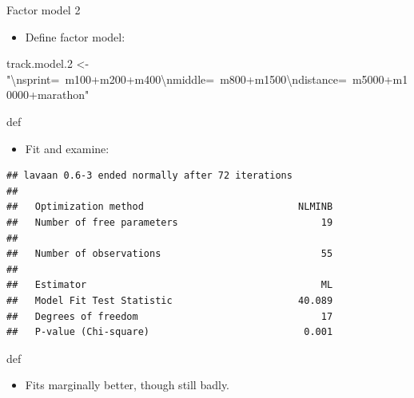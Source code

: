 \documentclass[ignorenonframetext,]{beamer}
\newenvironment{Shaded}{\begin{snugshade}}{\end{snugshade}}
\newcommand{\CharTok}[1]{\textcolor[rgb]{0.31,0.60,0.02}{#1}}
\newcommand{\DataTypeTok}[1]{\textcolor[rgb]{0.13,0.29,0.53}{#1}}
\newcommand{\FloatTok}[1]{\textcolor[rgb]{0.00,0.00,0.81}{#1}}
\newcommand{\KeywordTok}[1]{\textcolor[rgb]{0.13,0.29,0.53}{\textbf{#1}}}
\newcommand{\NormalTok}[1]{#1}
\newcommand{\OperatorTok}[1]{\textcolor[rgb]{0.81,0.36,0.00}{\textbf{#1}}}
\newcommand{\StringTok}[1]{\textcolor[rgb]{0.31,0.60,0.02}{#1}}
\providecommand{\tightlist}{%
  \setlength{\itemsep}{0pt}\setlength{\parskip}{0pt}}
\begin{document}
\begin{frame}[fragile]{Factor model 2}
\protect\hypertarget{factor-model-2}{}

\begin{itemize}
\tightlist
\item
  Define factor model:
\end{itemize}

\begin{Shaded}
\begin{Highlighting}[]
\NormalTok{track.model}\FloatTok{.2}\NormalTok{ <-}\StringTok{ "}\CharTok{\textbackslash{}n}\StringTok{sprint=~m100+m200+m400}\CharTok{\textbackslash{}n}\StringTok{middle=~m800+m1500}\CharTok{\textbackslash{}n}\StringTok{distance=~m5000+m10000+marathon"}
\end{Highlighting}
\end{Shaded}

def

\begin{itemize}
\tightlist
\item
  Fit and examine:
\end{itemize}

\begin{Shaded}
\end{Shaded}

\begin{verbatim}
## lavaan 0.6-3 ended normally after 72 iterations
## 
##   Optimization method                           NLMINB
##   Number of free parameters                         19
## 
##   Number of observations                            55
## 
##   Estimator                                         ML
##   Model Fit Test Statistic                      40.089
##   Degrees of freedom                                17
##   P-value (Chi-square)                           0.001
\end{verbatim}

def

\begin{itemize}
\tightlist
\item
  Fits marginally better, though still badly.
\end{itemize}

\end{frame}
\end{document}
